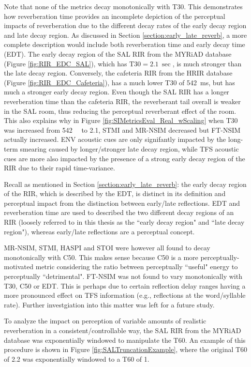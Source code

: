 Note that none of the metrics decay monotonically with T30. This demonstrates how reverberation time provides an incomplete depiction of the perceptual impacts of reverberation due to the different decay rates of the early decay region and late decay region. As discussed in Section \ref{section:early_late_reverb}, a more complete description would include both reverberation time and early decay time (EDT). The early decay region of the SAL RIR from the MYRiAD database (Figure \ref{fig:RIR_EDC_SAL}), which has $\mathrm{T30} = \qty{2.1}{\sec}$, is much stronger than the late decay region. Conversely, the cafeteria RIR from the HRIR database (Figure \ref{fig:RIR_EDC_Cafeteria}), has a much lower T30 of \qty{542}{\milli\second}, but has much a stronger early decay region. Even though the SAL RIR has a longer reverberation time than the cafeteria RIR, the reverberant tail overall is weaker in the SAL room, thus reducing the perceptual reverberant effect of the room. This also explains why in Figure \ref{fig:SIMetricsEval_Real_wScaling} when T30 was increased from \qty{542}{\milli\sec} to \qty{2.1}{\sec}, STMI and MR-NSIM decreased but FT-NSIM actually increased. ENV acoustic cues are only signifantly impacted by the long-term smearing caused by longer/stronger late decay region, while TFS acoustic cues are more also impacted by the presence of a strong early decay region of the RIR due to their rapid time-variance. 

Recall as mentioned in Section \ref{section:early_late_reverb}: the early decay region of the RIR, which is described by the EDT, is distinct in its definition and perceptual impact from the distinction between early/late reflections. EDT and reverberation time  are used to described the two different decay regions of an RIR (loosely referred to in this thesis as the ``early decay region" and ``late decay region"), whereas early/late reflections are a perceptual concept. 


MR-NSIM, STMI, HASPI and STOI were however all found to decay monotonically with C50. This makes sense because C50 is a more perceptually-motivated metric considering the ratio between perceptually ``useful" energy to perceptually ``detrimental". FT-NSIM was not found to vary monotonically with T30, C50 or EDT. This is perhaps due to certain reflection delay ranges having a more pronounced effect on TFS information (e.g., reflections at the word/syllable rate). Further investgiation into this matter was left for a future study.


To analyze the impact on perception of variable amounts of realistic reverberation in a consistent/controllable way, the SAL RIR from the MYRiAD database was exponentially windowed to manipulate the T60. An example of this procedure is shown in Figure \ref{fig:SALTruncationExample}, where the original T60 of \qty{2.2}{\sec} was exponentially windowed to a T60 of \qty{1}{\sec}.

